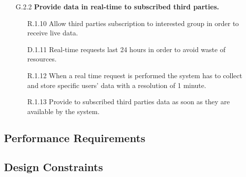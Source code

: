 \begin{enumerate}
\begin{enumerate}
    \item [G.2.2] \textbf{Provide data in real-time to subscribed third parties.}
		\begin{enumerate}
    	\item [R.1.10] Allow third parties subscription to interested group in order to receive live data.
    	\item [D.1.11] Real-time requests last 24 hours in order to avoid waste of resources.
    	\item [R.1.12] When a real time request is performed the system has to collect and store specific users' data with a resolution of 1 minute.
    	\item [R.1.13] Provide to subscribed third parties data as soon as they are available by the system.
    	\end{enumerate}
    		
    	
    	
  	
			
		
		
			
	\end{enumerate}

\end{enumerate}




\subsection{Performance Requirements}

\subsection{Design Constraints}
